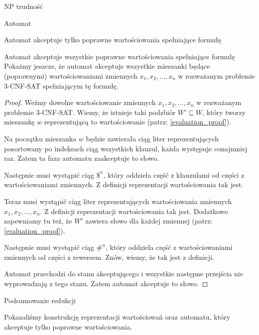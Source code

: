 \documentclass{article}
\theoremstyle{definition}
\theoremstyle{remark}
\begin{document}
\begin{section}{NP trudność}
\begin{subsection}{Automat}
\begin{subsection}{Automat akceptuje tylko poprawne wartościowania spełniające formułę}
     \end{subsection}

     \begin{subsection}{Automat akceptuje wszystkie poprawne wartościowania spełniające formułę}
         Pokażmy jeszcze, że automat akceptuje wszystkie mieszanki będące (poprawnymi)
         wartościowaniami zmiennych $x_1, x_2, \ldots, x_n$ w rozważanym problemie
         3-CNF-SAT spełniającym tę formułę.

         \begin{proof}
             Weźmy dowolne wartościowanie zmiennych $x_1, x_2, \ldots, x_n$ w rozważanym problemie 3-CNF-SAT.
             Wiemy, że istnieje taki podzbiór $W' \subseteq W$, który tworzy mieszankę $w$ reprezentującą to wartościowanie (patrz: \ref{evaluation_proof}).

             Na początku mieszanka $w$ będzie zawierała ciąg liter reprezentujących
             posortowany po indeksach ciąg wszystkich klauzul, każda występuje conajmniej
             raz. Zatem ta faza automatu zaakceptuje to słowo.

             Następnie musi wystąpić ciąg $ \$^n $, który oddziela część z klauzulami od
             części z wartościowaniami zmiennych. Z definicji reprezentacji wartościowania
             tak jest.

             Teraz musi wystąpić ciąg liter reprezentujących wartościowania zmiennych $x_1,
                 x_2, \ldots, x_n$. Z definicji reprezentacji wartościowania tak jest. Dodatkowo
             zapewniamy tu też, że $W'$ zawiera słowo dla każdej zmiennej (patrz:
             \ref{evaluation_proof}).

             Następnie musi wystąpić ciąg $ \#^n $, który oddziela część z wartościowaniami
             zmiennych od części z rewersem. Znów, wiemy, że tak jest z definicji.

             Automat przechodzi do stanu akceptującego i wszystkie następne przejścia nie
             wyprowadzają z tego stanu. Zatem automat akceptuje to słowo.

         \end{proof}
     \end{subsection}
 \end{subsection}

 \begin{subsection}{Podsumowanie redukcji}

     Pokazaliśmy konstrukcję reprezentacji wartościowań oraz automatu, który
     akceptuje tylko poprawne wartościowania.


\end{subsection}
\end{section}
\end{document}
